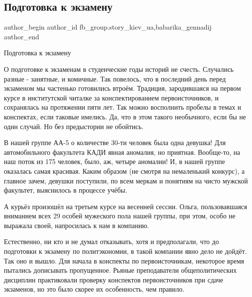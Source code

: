  
 
 
 
 
 
\subsection{Подготовка к экзамену}
\label{sec:18_02_2021.fb.fb_group.story_kiev_ua.1.podgotovka_ekzamen}
 
\ifcmt
 author_begin
   author_id fb_group.story_kiev_ua,babarika_gennadij
 author_end
\fi

Подготовка к экзамену

О подготовке к экзаменам в студенческие годы историй не счесть.  Случались
разные - занятные, и комичные. Так повелось, что в последний день перед
экзаменом  мы частенько готовились втроём.   Традиция, зародившаяся  на первом
курсе в институтской читалке за конспектированием первоисточников,  и
сохранялась на протяжении пяти лет. Так можно восполнить пробелы в темах и
конспектах, если таковые имелись. Да, что в этом такого необычного, если бы не
один случай. Но без  предыстории не обойтись.

В нашей группе АА-5 о количестве 30-ти человек  была одна девушка! Для
автомобильного факультета КАДИ явная аномалия, но приятная. Вообще-то, на наш
поток из 175 человек,  было, аж, четыре аномалии!  И, в нашей группе оказалась
самая красивая. Каким образом (не смотря на немаленький конкурс), а главное
зачем, девушки поступили,  по всем меркам и понятиям на чисто мужской
факультет, выяснилось  в процессе учёбы.  

А курьёз произошёл на третьем курсе на весенней сессии. Ольга,
пользовавшаяся вниманием всех 29 особей мужеского пола нашей группы, при
этом, особо не выражала своей,  напросилась к нам в компанию.

Естественно, ни кто и не думал отказывать, хотя и предполагали, что  до
подготовки к экзамену по политэкономии,  в такой компании явно дело не
дойдёт. Так оно и вышло. Для начала в конспекты по первоисточникам,
некоторое время пытались  дописывать пропущенное. Рьяные преподаватели
общеполитических дисциплин практиковали проверку конспектов
первоисточников при сдаче экзаменов, но это было скорее их особенность,
чем правило. 

